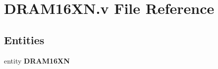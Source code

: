 \section{D\-R\-A\-M16\-X\-N.\-v File Reference}
\label{_d_r_a_m16_x_n_8v}
\subsection*{Entities}
\begin{DoxyCompactItemize}
\item 
entity {\bf D\-R\-A\-M16\-X\-N}
\end{DoxyCompactItemize}

